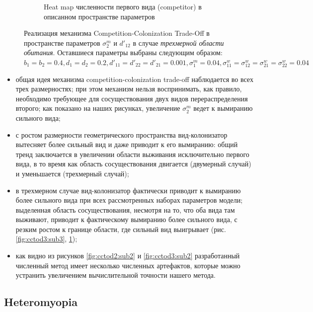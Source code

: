 \begin{figure}
\begin{subfigure}{.5\textwidth}
		\caption{Heat map численности первого вида (competitor) в описанном пространстве параметров}
		\label{fig:cctod3:sub4}
	\end{subfigure}
	\caption{Реализация механизма Competition-Colonization Trade-Off  в пространстве параметров  $\sigma^m_2$ и $d'_{12}$ в случае  \emph{трехмерной области обитания}. Оставшиеся параметры выбраны следующим образом:  $b_{1}=b_{2}=0.4
		, d_{1}=d_{2}=0.2
		, d'_{11}=d'_{22}=d'_{21}=0.001,
		\sigma_{1}^{m}=0.04
		, \sigma_{11}^{w}=\sigma_{12}^{w}=\sigma_{21}^{w}=\sigma_{22}^{w}=0.04$}
	\label{fig:cctod3}
\end{figure}


\begin{itemize}
	
	\item общая идея механизма competition-colonization trade-off наблюдается во всех трех размерностях; при этом механизм нельзя воспринимать, как правило, необходимо требующее для сосуществования двух видов перераспределения второго; как показано на наших рисунках, увеличение $ \sigma_{2}^{m} $ ведет к вымиранию сильного вида; 
	
	\item с ростом размерности геометрического пространства вид-колонизатор вытесняет более сильный вид и даже приводит к его вымиранию: общий тренд заключается в увеличении области выживания исключительно первого вида, в то время как область сосуществования двигается (двумерный случай) и уменьшается (трехмерный случай); 
	
	\item в трехмерном случае вид-колонизатор фактически приводит к вымиранию более сильного вида при всех рассмотренных наборах параметров модели; выделенная область сосуществования, несмотря на то, что оба вида там выживают, приводит к фактическому вымиранию более сильного вида, с резким ростом к границе области, где сильный вид выигрывает (рис. \ref{fig:cctod3:sub3}, \ref{fig:cctod3:sub4});
	
	\item как видно из рисунков \ref{fig:cctod2:sub2} и \ref{fig:cctod3:sub2} разработанный численный метод имеет несколько численных артефактов, которые можно устранить увеличением вычислительной точности нашего метода.
\end{itemize}



\subsection{Heteromyopia}


